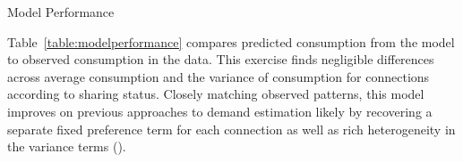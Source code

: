 \documentclass[12pt]{article}
\begin{document}
\begin{table}
\caption{Model Performance}\label{table:modelperformance}
\centering

\end{table}
Table~\ref{table:modelperformance} compares predicted consumption from the model to observed consumption in the data.  This exercise finds negligible differences across average consumption and the variance of consumption for connections according to sharing status.  Closely matching observed patterns, this model improves on previous approaches to demand estimation likely by recovering a separate fixed preference term for each connection as well as rich heterogeneity in the variance terms (\cite{szabo2015value}). 

\end{document}
